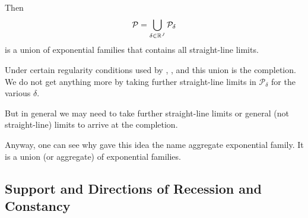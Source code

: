 Then
$$
   \mathcal{P} = \bigcup_{\delta \in \mathbb{R}^J} \mathcal{P}_\delta
$$
is a union of exponential families that contains all straight-line limits.

Under certain regularity conditions used by \citet{barndorff-nielsen},
\citet{brown}, and \citet{geyer-gdor} this union is the completion.
We do not get anything more by taking further straight-line limits
in $\mathcal{P}_\delta$ for the various $\delta$.

But in general \citep[Chapters~2 and~4]{geyer-thesis} we may need to take
further straight-line limits or general (not straight-line) limits
to arrive at the completion.

Anyway, one can see why \citet{brown} gave this idea the name aggregate
exponential family.  It is a union (or aggregate) of exponential families.

\subsection{Support and Directions of Recession and Constancy}

